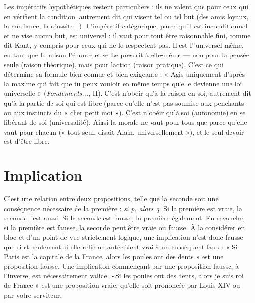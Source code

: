 Les impératifs hypothétiques restent particuliers : ils ne valent que pour
ceux qui en vérifient la condition, autrement dit qui visent tel ou tel but (des
amis loyaux, la confiance, la réussite...). L’impératif catégorique, parce qu’il est
inconditionnel et ne vise aucun but, est universel : il vaut pour tout être raisonnable
fini, comme dit Kant, y compris pour ceux qui ne le respectent pas. Il est
l’'universel même, en tant que la raison l’énonce et se Le prescrit à elle-même —
non pour la pensée seule (raison théorique), mais pour laction (raison
pratique). C’est ce qui détermine sa formule bien connue et bien exigeante :
« Agis uniquement d’après la maxime qui fait que tu peux vouloir en même
temps qu'elle devienne une loi universelle » ({\it Fondements...}, II). C’est n’obéir
qu’à la raison en soi, autrement dit qu’à la partie de soi qui est libre (parce
qu’elle n’est pas soumise aux penchants ou aux instincts du « cher petit moi »).
C’est n’obéir qu’à soi (autonomie) en se libérant de soi (universalité). Ainsi la
morale ne vaut pour tous que parce qu’elle vaut pour chacun (« tout seul, disait
Alain, universellement »), et le seul devoir est d’être libre.

\section{Implication}
C'est une relation entre deux propositions, telle que la
seconde soit une conséquence nécessaire de la première : {\it si
p, alors q}. Si la première est vraie, la seconde l’est aussi. Si la seconde est fausse,
la première également. En revanche, si la première est fausse, la seconde peut
être vraie ou fausse. À la considérer en bloc et d’un point de vue strictement
logique, une implication n’est donc fausse que si et seulement si elle relie un
antécédent vrai à un conséquent faux : « Si Paris est la capitale de la France,
alors les poules ont des dents » est une proposition fausse. Une implication
commençant par une proposition fausse, à l’inverse, est nécessairement valide.
«Si les poules ont des dents, alors je suis roi de France » est une proposition
vraie, qu’elle soit prononcée par Louis XIV ou par votre serviteur.

